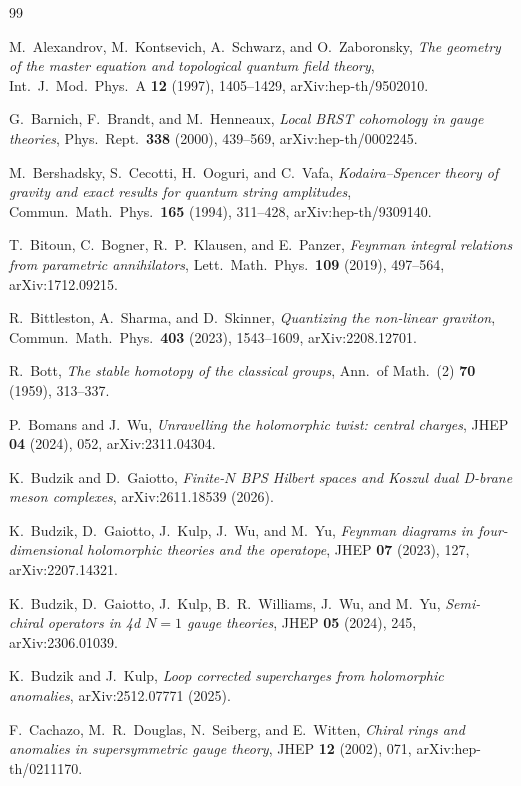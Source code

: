 \documentclass[11pt,a4paper]{article}
\theoremstyle{plain}
\theoremstyle{definition}
\theoremstyle{remark}
\numberwithin{equation}{section}
\numberwithin{figure}{section}
\numberwithin{table}{section}
\def\mathcal#1{#1}%
\begin{document}
\begin{thebibliography}{99}\footnotesize\raggedright\setlength{\itemsep}{1.5pt}\setlength{\parskip}{0pt}

M.~Alexandrov, M.~Kontsevich, A.~Schwarz, and O.~Zaboronsky,
\emph{The geometry of the master equation and topological quantum field theory},
Int.\ J.\ Mod.\ Phys.\ A \textbf{12} (1997), 1405--1429, arXiv:hep-th/9502010.

G.~Barnich, F.~Brandt, and M.~Henneaux,
\emph{Local BRST cohomology in gauge theories},
Phys.\ Rept.\ \textbf{338} (2000), 439--569, arXiv:hep-th/0002245.

M.~Bershadsky, S.~Cecotti, H.~Ooguri, and C.~Vafa,
\emph{Kodaira--Spencer theory of gravity and exact results for quantum string amplitudes},
Commun.\ Math.\ Phys.\ \textbf{165} (1994), 311--428, arXiv:hep-th/9309140.

T.~Bitoun, C.~Bogner, R.~P.~Klausen, and E.~Panzer,
\emph{Feynman integral relations from parametric annihilators},
Lett.\ Math.\ Phys.\ \textbf{109} (2019), 497--564, arXiv:1712.09215.

R.~Bittleston, A.~Sharma, and D.~Skinner,
\emph{Quantizing the non-linear graviton},
Commun.\ Math.\ Phys.\ \textbf{403} (2023), 1543--1609, arXiv:2208.12701.

R.~Bott,
\emph{The stable homotopy of the classical groups},
Ann.\ of Math.\ (2) \textbf{70} (1959), 313--337.

P.~Bomans and J.~Wu,
\emph{Unravelling the holomorphic twist: central charges},
JHEP \textbf{04} (2024), 052, arXiv:2311.04304.

K.~Budzik and D.~Gaiotto,
\emph{Finite-$N$ BPS Hilbert spaces and Koszul dual D-brane meson complexes},
arXiv:2611.18539 (2026).

K.~Budzik, D.~Gaiotto, J.~Kulp, J.~Wu, and M.~Yu,
\emph{Feynman diagrams in four-dimensional holomorphic theories and the operatope},
JHEP \textbf{07} (2023), 127, arXiv:2207.14321.

K.~Budzik, D.~Gaiotto, J.~Kulp, B.~R.~Williams, J.~Wu, and M.~Yu,
\emph{Semi-chiral operators in 4d $\mathcal{N}=1$ gauge theories},
JHEP \textbf{05} (2024), 245, arXiv:2306.01039.

K.~Budzik and J.~Kulp,
\emph{Loop corrected supercharges from holomorphic anomalies},
arXiv:2512.07771 (2025).

F.~Cachazo, M.~R.~Douglas, N.~Seiberg, and E.~Witten,
\emph{Chiral rings and anomalies in supersymmetric gauge theory},
JHEP \textbf{12} (2002), 071, arXiv:hep-th/0211170.


\end{thebibliography}
\end{document}
